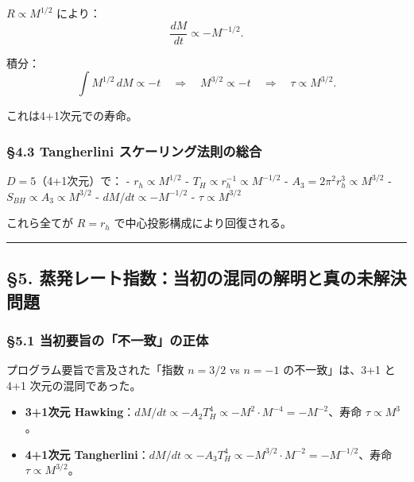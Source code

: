 \documentclass[a4paper,11pt]{ltjsarticle}
\theoremstyle{definition}
\providecommand{\tightlist}{\setlength{\itemsep}{0pt}\setlength{\parskip}{0pt}}
\begin{document}
\(R \propto M^{1/2}\) により： \[\frac{dM}{dt} \propto -M^{-1/2}.\]

積分：
\[\int M^{1/2}\, dM \propto -t \quad \Longrightarrow \quad M^{3/2} \propto -t \quad \Longrightarrow \quad \tau \propto M^{3/2}.\]

これは4+1次元での寿命。

\subsubsection{§4.3 Tangherlini
スケーリング法則の総合}\label{tangherlini-ux30b9ux30b1ux30fcux30eaux30f3ux30b0ux6cd5ux5247ux306eux7dcfux5408}

\(D = 5\)（4+1次元）で： - \(r_h \propto M^{1/2}\) -
\(T_H \propto r_h^{-1} \propto M^{-1/2}\) -
\(A_3 = 2\pi^2 r_h^3 \propto M^{3/2}\) -
\(S_{BH} \propto A_3 \propto M^{3/2}\) - \(dM/dt \propto -M^{-1/2}\) -
\(\tau \propto M^{3/2}\)

これら全てが \(R = r_h\) で中心投影構成により回復される。

\begin{center}\rule{0.5\linewidth}{0.5pt}\end{center}

\subsection{§5.
蒸発レート指数：当初の混同の解明と真の未解決問題}\label{ux84b8ux767aux30ecux30fcux30c8ux6307ux6570ux5f53ux521dux306eux6df7ux540cux306eux89e3ux660eux3068ux771fux306eux672aux89e3ux6c7aux554fux984c}

\subsubsection{§5.1
当初要旨の「不一致」の正体}\label{ux5f53ux521dux8981ux65e8ux306eux4e0dux4e00ux81f4ux306eux6b63ux4f53}

プログラム要旨で言及された「指数 \(n=3/2\) vs \(n=-1\) の不一致」は、3+1
と 4+1 次元の混同であった。

\begin{itemize}
\tightlist
\item
  \textbf{3+1次元
  Hawking}：\(dM/dt \propto -A_2 T_H^4 \propto -M^2 \cdot M^{-4} = -M^{-2}\)、寿命
  \(\tau \propto M^3\)。
\item
  \textbf{4+1次元
  Tangherlini}：\(dM/dt \propto -A_3 T_H^4 \propto -M^{3/2} \cdot M^{-2} = -M^{-1/2}\)、寿命
  \(\tau \propto M^{3/2}\)。
\end{itemize}
\end{document}
